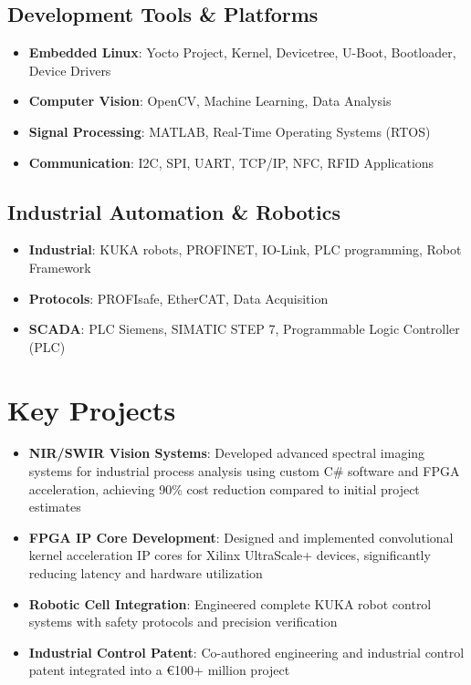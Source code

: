 \documentclass[11pt,a4paper]{article}
\begin{document}
\subsection{Development Tools \& Platforms}
\begin{itemize}
    \item \textbf{Embedded Linux}: Yocto Project, Kernel, Devicetree, U-Boot, Bootloader, Device Drivers
    \item \textbf{Computer Vision}: OpenCV, Machine Learning, Data Analysis
    \item \textbf{Signal Processing}: MATLAB, Real-Time Operating Systems (RTOS)
    \item \textbf{Communication}: I2C, SPI, UART, TCP/IP, NFC, RFID Applications
\end{itemize}

\subsection{Industrial Automation \& Robotics}
\begin{itemize}
    \item \textbf{Industrial}: KUKA robots, PROFINET, IO-Link, PLC programming, Robot Framework
    \item \textbf{Protocols}: PROFIsafe, EtherCAT, Data Acquisition
    \item \textbf{SCADA}: PLC Siemens, SIMATIC STEP 7, Programmable Logic Controller (PLC)
\end{itemize}

\section{Key Projects}
\begin{itemize}
    \item \textbf{NIR/SWIR Vision Systems}: Developed advanced spectral imaging systems for industrial process analysis using custom C\# software and FPGA acceleration, achieving 90\% cost reduction compared to initial project estimates
    \item \textbf{FPGA IP Core Development}: Designed and implemented convolutional kernel acceleration IP cores for Xilinx UltraScale+ devices, significantly reducing latency and hardware utilization
    \item \textbf{Robotic Cell Integration}: Engineered complete KUKA robot control systems with safety protocols and precision verification
    \item \textbf{Industrial Control Patent}: Co-authored engineering and industrial control patent integrated into a €100+ million project
\end{itemize}
\end{document}
